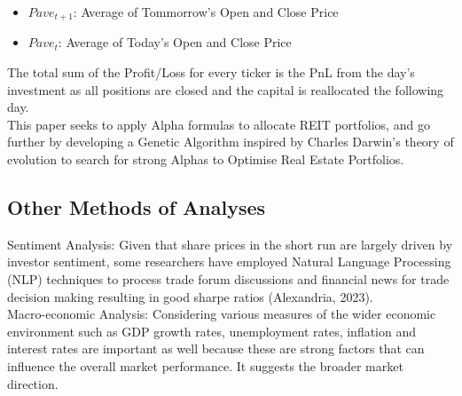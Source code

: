 \documentclass[a4paper,12pt]{report}
\numberwithin{equation}{section}
\theoremstyle{definition}
\begin{document}
\begin{itemize}
  \item {$Pave_{t+1}$: Average of Tommorrow's Open and Close Price}
  \item {$Pave_{t}$: Average of Today's Open and Close Price}
\end{itemize}

The total sum of the Profit/Loss for every ticker is the PnL from the day's investment as all positions are closed and the capital is reallocated the following day. \\

This paper seeks to apply Alpha formulas to allocate REIT portfolios, and go further by developing a Genetic Algorithm inspired by Charles Darwin's theory of evolution to search for strong Alphas to Optimise Real Estate Portfolios. 

\subsection{Other Methods of Analyses}
Sentiment Analysis: Given that share prices in the short run are largely driven by investor sentiment, some researchers have employed Natural Language Processing (NLP) techniques to process trade forum discussions and financial news for trade decision making resulting in good sharpe ratios (Alexandria, 2023). \\

Macro-economic Analysis: Considering various measures of the wider economic environment such as GDP growth rates, unemployment rates, inflation and interest rates are important as well because these are strong factors that can influence the overall market performance. It suggests the broader market direction.
\end{document}
